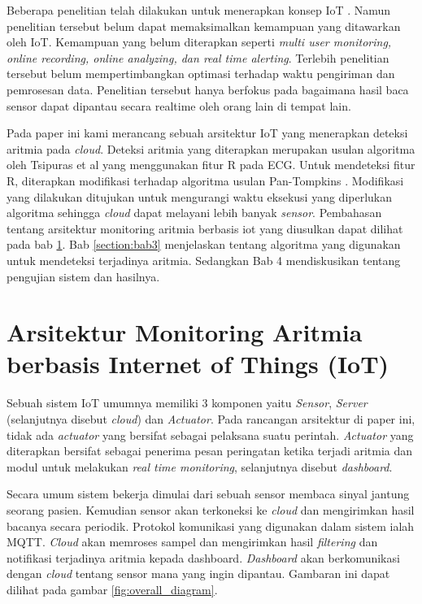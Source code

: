 \documentclass[]{indojc_single}
\begin{document}
Beberapa penelitian telah dilakukan untuk menerapkan konsep IoT \cite{daniel_barataa, paola_pierleoni, vasu_jindal, mamidi}. Namun penelitian tersebut belum dapat memaksimalkan kemampuan yang ditawarkan oleh IoT. Kemampuan yang belum diterapkan seperti \textit{multi user monitoring, online recording, online analyzing, dan real time alerting}. Terlebih penelitian tersebut belum mempertimbangkan optimasi terhadap waktu pengiriman dan pemrosesan data. Penelitian tersebut hanya berfokus pada bagaimana hasil baca sensor dapat dipantau secara realtime oleh orang lain di tempat lain.

Pada paper ini kami merancang sebuah arsitektur IoT yang menerapkan deteksi aritmia pada \textit{cloud}. Deteksi aritmia yang diterapkan merupakan usulan algoritma oleh Tsipuras et al \cite{tsipouras} yang menggunakan fitur R pada ECG. Untuk mendeteksi fitur R, diterapkan modifikasi terhadap algoritma usulan Pan-Tompkins \cite{pantom}. Modifikasi yang dilakukan ditujukan untuk mengurangi waktu eksekusi yang diperlukan algoritma sehingga \textit{cloud} dapat melayani lebih banyak \textit{sensor}. Pembahasan tentang arsitektur monitoring aritmia berbasis iot yang diusulkan dapat dilihat pada bab \ref{section:bab2}. Bab \ref{section:bab3} menjelaskan tentang algoritma yang digunakan untuk mendeteksi terjadinya aritmia. Sedangkan Bab 4 mendiskusikan tentang pengujian sistem dan hasilnya.

\section{Arsitektur Monitoring Aritmia berbasis Internet of Things (IoT)} \label{section:bab2}
Sebuah sistem IoT umumnya memiliki 3 komponen yaitu \textit{Sensor}, \textit{Server} (selanjutnya disebut \textit{cloud}) dan \textit{Actuator}. Pada rancangan arsitektur di paper ini, tidak ada \textit{actuator} yang bersifat sebagai pelaksana suatu perintah. \textit{Actuator} yang diterapkan bersifat sebagai penerima pesan peringatan ketika terjadi aritmia dan modul untuk melakukan \textit{real time monitoring}, selanjutnya disebut \textit{dashboard}.

Secara umum sistem bekerja dimulai dari sebuah sensor membaca sinyal jantung seorang pasien. Kemudian sensor akan terkoneksi ke \textit{cloud} dan mengirimkan hasil bacanya secara periodik. Protokol komunikasi yang digunakan dalam sistem ialah MQTT. \textit{Cloud} akan memroses sampel dan mengirimkan hasil \textit{filtering} dan notifikasi terjadinya aritmia kepada dashboard. \textit{Dashboard} akan berkomunikasi dengan \textit{cloud} tentang sensor mana yang ingin dipantau. Gambaran ini dapat dilihat pada gambar \ref{fig:overall_diagram}.
\end{document}

